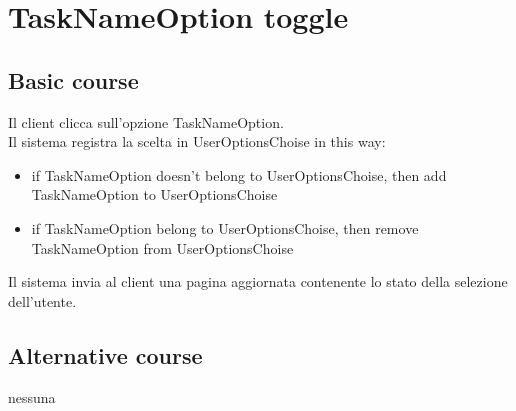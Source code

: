 \section{TaskNameOption toggle}
\label{seq:TaskNameOption_toggle}
\subsection{Basic course}
Il client clicca sull'opzione TaskNameOption. \\
Il sistema registra la scelta in UserOptionsChoise in this way:
\begin{itemize}
  \item if TaskNameOption doesn't belong to UserOptionsChoise, then add
  TaskNameOption to UserOptionsChoise
  \item if TaskNameOption belong to UserOptionsChoise, then remove
  TaskNameOption from UserOptionsChoise 
\end{itemize}
Il sistema invia al client una pagina aggiornata contenente lo stato della
selezione dell'utente.

\subsection{Alternative course}
\begin{description}
\item[nessuna]
\end{description}